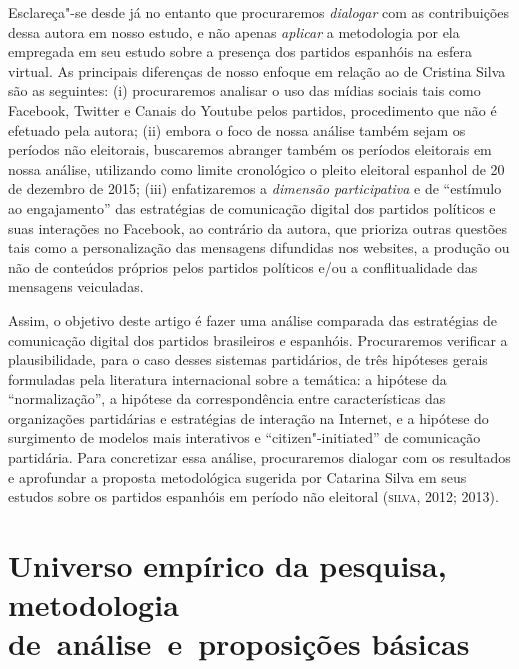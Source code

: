 Esclareça"-se desde já no entanto que procuraremos \emph{dialogar} com as
contribuições dessa autora em nosso estudo, e não apenas \emph{aplicar}
a metodologia por ela empregada em seu estudo sobre a presença dos
partidos espanhóis na esfera virtual. As principais diferenças de nosso
enfoque em relação ao de Cristina Silva são as seguintes: (i)
procuraremos analisar o uso das mídias sociais tais como Facebook,
Twitter e Canais do Youtube pelos partidos, procedimento que não é
efetuado pela autora; (ii) embora o foco de nossa análise também sejam
os períodos não eleitorais, buscaremos abranger também os períodos
eleitorais em nossa análise, utilizando como limite cronológico o pleito
eleitoral espanhol de 20 de dezembro de 2015; (iii) enfatizaremos a
\emph{dimensão participativa} e de ``estímulo ao engajamento'' das
estratégias de comunicação digital dos partidos políticos e suas
interações no Facebook, ao contrário da autora, que prioriza outras
questões tais como a personalização das mensagens difundidas nos
websites, a produção ou não de conteúdos próprios pelos partidos
políticos e/ou a conflitualidade das mensagens veiculadas.

Assim, o objetivo deste artigo é fazer uma análise comparada das
estratégias de comunicação digital dos partidos brasileiros e espanhóis.
Procuraremos verificar a plausibilidade, para o caso desses sistemas
partidários, de três hipóteses gerais formuladas pela literatura
internacional sobre a temática: a hipótese da ``normalização'', a
hipótese da correspondência entre características das organizações
partidárias e estratégias de interação na Internet, e a hipótese do
surgimento de modelos mais interativos e ``citizen"-initiated'' de
comunicação partidária. Para concretizar essa análise, procuraremos
dialogar com os resultados e aprofundar a proposta metodológica sugerida
por Catarina Silva em seus estudos sobre os partidos espanhóis em
período não eleitoral (\textsc{silva}, 2012; 2013).

\section{Universo empírico da pesquisa, metodologia de~análise~e~proposições básicas}

